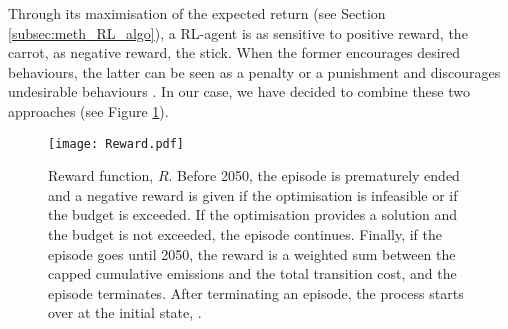 Through its maximisation of the expected return (see Section \ref{subsec:meth_RL_algo}), a \gls{RL}-agent is as sensitive to positive reward, \ie the carrot, as negative reward, \ie the stick.  When the former encourages desired behaviours, the latter can be seen as a penalty or a punishment and discourages undesirable behaviours \cite{sutton2018reinforcement}. In our case, we have decided to combine these two approaches (see Figure \ref{fig:Reward}).

\begin{figure}[!htbp]
\centering
\texttt{[image: Reward.pdf]}
\caption{Reward function, $R$. Before 2050, the episode is prematurely ended and a negative reward is given if the optimisation is infeasible or if the  budget is exceeded. If the optimisation provides a solution and the  budget is not exceeded, the episode continues. Finally, if the episode goes until 2050, the reward is a weighted sum between the capped cumulative emissions and the total transition cost, and the episode terminates. After terminating an episode, the process starts over at the initial state, .}
\label{fig:Reward}
\end{figure} 

